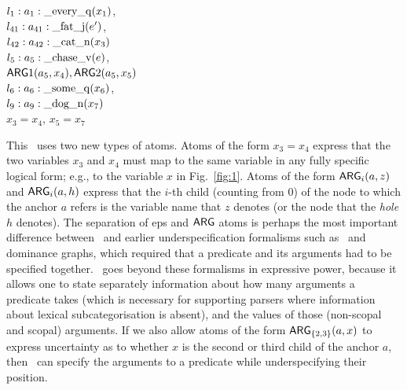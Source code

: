 \begin{examples}
\item 
$l_1:a_1:\mathrm{\_every\_q}(x_1)$, \\
$l_{41}:a_{41}:\mathrm{\_fat\_j}(e')$,\\
$l_{42}:a_{42}:\mathrm{\_cat\_n}(x_3)$\\
$l_5:a_5:\mathrm{\_chase\_v}(e)$, \\
\hspace*{0.1in} $\mathsf{ARG}1(a_5,x_4),
\mathsf{ARG}2(a_5,x_5)$\\ 
$l_6:a_6:\mathrm{\_some\_q}(x_6)$, \\
$l_9:a_9:\mathrm{\_dog\_n}(x_7)$\\
$x_3=x_4$, $x_5=x_7$
\label{ex:cat-partial-parser}
\end{examples}

This \rmrs\ uses two new types of atoms.  Atoms of the form $x_3=x_4$
express that the two variables $x_3$ and $x_4$ must map to the same
variable in any fully specific logical form; e.g., to the variable $x$
in Fig.~\ref{fig:1}.  Atoms of the form
$\mathsf{ARG}_i(a,z)$ and $\mathsf{ARG}_i(a,h)$ express that the $i$-th child
(counting from 0) of the
node to which the anchor $a$ refers is the variable name that $z$ denotes
(or the node that the {\em hole} $h$ denotes).  The separation of
{\sc ep}s and $\mathsf{ARG}$ atoms is perhaps the most important difference between
\rmrs\ and earlier underspecification formalisms such as \mrs\ and
dominance graphs, which required that a predicate and its arguments
had to be specified together.  \rmrs\ goes beyond these formalisms in
expressive power, because it allows one to state separately
information about how many arguments a predicate takes (which is
necessary for supporting parsers where information about lexical
subcategorisation is absent), and the values of
those (non-scopal and scopal) arguments.   If we also allow atoms of the form
$\mathsf{ARG}_{\{2,3\}}(a,x)$ to express uncertainty as to whether $x$ is the
second or third child of the anchor $a$, then \rmrs\ can specify the
arguments to a predicate while underspecifying their position. 

